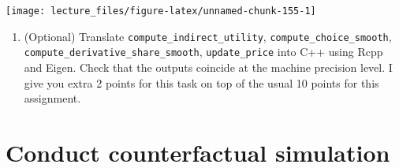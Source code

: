 \documentclass[
]{book}
\newenvironment{Shaded}{\begin{snugshade}}{\end{snugshade}}
\newcommand{\AttributeTok}[1]{\textcolor[rgb]{0.77,0.63,0.00}{#1}}
\newcommand{\CommentTok}[1]{\textcolor[rgb]{0.56,0.35,0.01}{\textit{#1}}}
\newcommand{\DecValTok}[1]{\textcolor[rgb]{0.00,0.00,0.81}{#1}}
\newcommand{\FunctionTok}[1]{\textcolor[rgb]{0.00,0.00,0.00}{#1}}
\newcommand{\NormalTok}[1]{#1}
\newcommand{\OtherTok}[1]{\textcolor[rgb]{0.56,0.35,0.01}{#1}}
\newcommand{\SpecialCharTok}[1]{\textcolor[rgb]{0.00,0.00,0.00}{#1}}
\newcommand{\StringTok}[1]{\textcolor[rgb]{0.31,0.60,0.02}{#1}}
\providecommand{\tightlist}{%
  \setlength{\itemsep}{0pt}\setlength{\parskip}{0pt}}
\begin{document}
\begin{Shaded}
\end{Shaded}

\begin{center}\texttt{[image: lecture\_files/figure-latex/unnamed-chunk-155-1]} \end{center}

\begin{enumerate}
\def\labelenumi{\arabic{enumi}.}
\setcounter{enumi}{1}
\tightlist
\item
  (Optional) Translate \texttt{compute\_indirect\_utility}, \texttt{compute\_choice\_smooth}, \texttt{compute\_derivative\_share\_smooth}, \texttt{update\_price} into C++ using Rcpp and Eigen. Check that the outputs coincide at the machine precision level. I give you extra 2 points for this task on top of the usual 10 points for this assignment.
\end{enumerate}

\hypertarget{conduct-counterfactual-simulation}{%
\section{Conduct counterfactual simulation}\label{conduct-counterfactual-simulation}}
\end{document}
